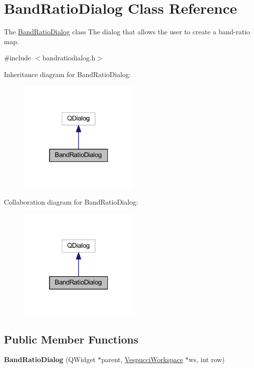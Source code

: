 \hypertarget{class_band_ratio_dialog}{\section{Band\+Ratio\+Dialog Class Reference}
\label{class_band_ratio_dialog}
}


The \hyperlink{class_band_ratio_dialog}{Band\+Ratio\+Dialog} class The dialog that allows the user to create a band-\/ratio map.  




{\ttfamily \#include $<$bandratiodialog.\+h$>$}



Inheritance diagram for Band\+Ratio\+Dialog\+:\nopagebreak
\begin{figure}[H]
\begin{center}
\leavevmode
\includegraphics[width=169pt]{class_band_ratio_dialog__inherit__graph}
\end{center}
\end{figure}


Collaboration diagram for Band\+Ratio\+Dialog\+:\nopagebreak
\begin{figure}[H]
\begin{center}
\leavevmode
\includegraphics[width=169pt]{class_band_ratio_dialog__coll__graph}
\end{center}
\end{figure}
\subsection*{Public Member Functions}
\begin{DoxyCompactItemize}
\item 
\hypertarget{class_band_ratio_dialog_a9f8135f338936413f8a02e149e95df0a}{{\bfseries Band\+Ratio\+Dialog} (Q\+Widget $\ast$parent, \hyperlink{class_vespucci_workspace}{Vespucci\+Workspace} $\ast$ws, int row)}\label{class_band_ratio_dialog_a9f8135f338936413f8a02e149e95df0a}

\end{DoxyCompactItemize}


